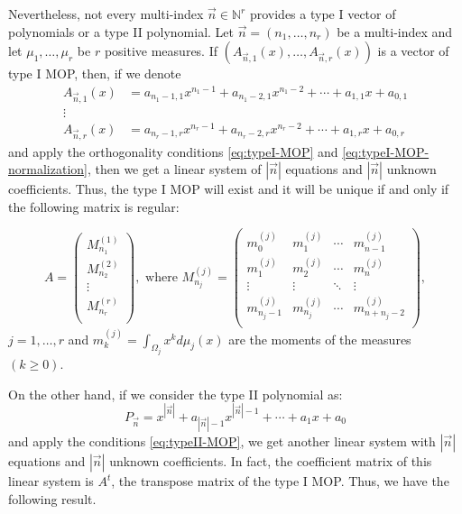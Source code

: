 \documentclass[12pt,a4]{article}
\theoremstyle{plain}
\newcommand{\N}[0]{\mathbb{N}}
\begin{document}
Nevertheless, not every multi-index $\vec n\in\N^r$ provides a type I vector of polynomials or a type II polynomial. Let $\vec n = (n_1,\dots,n_r)$ be a multi-index and let $\mu_1,\dots,\mu_r$ be $r$ positive measures. If $(A_{\vec n, 1}(x), \dots, A_{\vec n, r}(x))$ is a vector of type I MOP, then, if we denote
\begin{equation}
    \begin{split}
        A_{\vec n,1}(x) &= a_{n_1-1,1}x^{n_1-1} + a_{n_1-2,1}x^{n_1-2} + \cdots + a_{1,1}x + a_{0,1} \\
        \vdots & \\
        A_{\vec n,r}(x) &= a_{n_r-1,r}x^{n_r-1} + a_{n_r-2,r}x^{n_r-2} + \cdots + a_{1,r}x + a_{0,r}
    \end{split}
\end{equation}
and apply the orthogonality conditions \eqref{eq:typeI-MOP} and \eqref{eq:typeI-MOP-normalization}, then we get a linear system of $|\vec n|$ equations and $|\vec n|$ unknown coefficients. Thus, the type I MOP will exist and it will be unique if and only if the following matrix is regular:

\begin{equation}
    \label{eq:MOP-matrix}
    A=\left(\begin{array}{c}
    M_{n_1}^{(1)} \\ \hline
    M_{n_2}^{(2)} \\ \hline
    \vdots \\ \hline
    M_{n_r}^{(r)} \\ 
\end{array}\right), \text{ \ \  where \ \ } M_{n_j}^{(j)} = \begin{pmatrix}
    m_0^{(j)} & m_1^{(j)} & \cdots & m_{n-1}^{(j)} \\
    m_1^{(j)} & m_2^{(j)} & \cdots & m_{n}^{(j)} \\
    \vdots & \vdots & \ddots & \vdots \\
    m_{n_j-1}^{(j)} & m_{n_j}^{(j)} & \cdots & m_{n+n_j-2}^{(j)} \\
\end{pmatrix},
\end{equation}
$j=1,\dots,r$ and $m_k^{(j)}=\displaystyle\int_{\Omega_j} x^k d\mu_j(x)$ are the moments of the measures $(k\geq 0)$.

On the other hand, if we consider the type II polynomial as:
$$
P_{\vec n} = x^{|\vec n|} + a_{|\vec n|-1} x^{|\vec n|-1} + \cdots + a_1 x + a_0
$$
and apply the conditions \eqref{eq:typeII-MOP}, we get another linear system with $|\vec n|$ equations and $|\vec n|$ unknown coefficients. In fact, the coefficient matrix of this linear system is $A^t$, the transpose matrix of the type I MOP. Thus, we have the following result.
\end{document}
